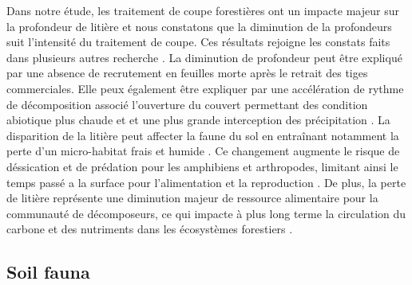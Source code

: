Dans notre étude, les traitement de coupe forestières ont un impacte majeur sur la profondeur de litière et nous constatons que la diminution de la profondeurs suit l'intensité du traitement de coupe.
Ces résultats rejoigne les constats faits dans plusieurs autres recherche \citep{Marshall2000Impactsforest,Mazerolle2021Woodlandsalamander}. 
La diminution de profondeur peut être expliqué par une absence de recrutement en feuilles morte après le retrait des tiges commerciales. 
Elle peux également être expliquer par une accélération de rythme de décomposition associé l'ouverture du couvert permettant des condition abiotique plus chaude et et une plus grande interception des précipitation \citep{Fierer2005LitterQuality,Butenschoen2011Interactiveeffects,Ameray2021Forestcarbon}. 
La disparition de la litière peut affecter la faune du sol en entraînant notamment la perte d'un micro-habitat frais et humide \citep{Spotila1972Roletemperature,Grover1998Influencecover,Niemela2007effectsforestry}. 
Ce changement augmente le risque de déssication et de prédation pour les amphibiens et arthropodes, limitant ainsi le temps passé a la surface pour l'alimentation et la reproduction \citep{deMaynadier1995relationshipforest,Koivula1999Leaflitter,Walton2013Topregulationlitter}. 
De plus, la perte de litière représente une diminution majeur de ressource alimentaire pour la communauté de décomposeurs, ce qui impacte à plus long terme la circulation du carbone et des nutriments dans les écosystèmes forestiers \citep{Handa2014Consequencesbiodiversity}.





\subsection*{Soil fauna}
\label{disc:soil_fauna}


